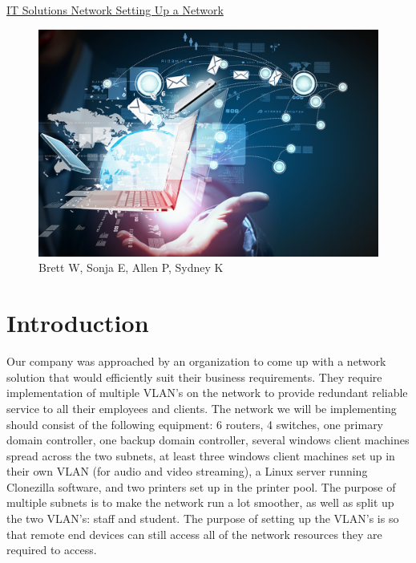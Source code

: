 \documentclass{article}
\begin{document}
\begin{center}
	\underline{\LARGE IT Solutions Network Setting Up a Network }
\begin{figure}[h]
		\includegraphics[width=1\textwidth]{1}
		\newline
		{Brett W, Sonja E, Allen P, Sydney K}
\end{figure}
\end{center}
	\newpage
	\tableofcontents
	\newpage
\section{Introduction}
	Our company was approached by an organization to come up with a network solution that would efficiently suit their business requirements. They require implementation of multiple VLAN’s on the network to provide redundant reliable service to all their employees and clients. The network we will be implementing should consist of the following equipment: 6 routers, 4 switches, one primary domain controller, one backup domain controller, several windows client machines spread across the two subnets, at least three windows client machines set up in their own VLAN (for audio and video streaming), a Linux server running Clonezilla software, and two printers set up in the printer pool.  
	\newline\newline
	The purpose of multiple subnets is to make the network run a lot smoother, as well as split up the two VLAN's: staff and student. The purpose of setting up the VLAN’s is so that remote end devices can still access all of the network resources they are required to access.\newline
	\newline\newline
	\newpage
\end{document}
